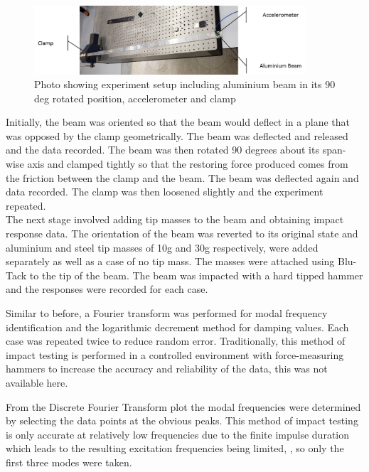 \documentclass[11pt]{article}
\begin{document}
\begin{figure}[H]
    \centering
    \includegraphics[width=0.9\textwidth]{photoedit.PNG}
    \caption{Photo showing experiment setup including aluminium beam in its 90 deg rotated position, accelerometer and clamp}
    \label{fig:photo}
\end{figure}{}

Initially, the beam was oriented so that the beam would deflect in a plane that was opposed by the clamp geometrically. The beam was deflected and released and the data recorded. The beam was then rotated 90 degrees about its span-wise axis and clamped tightly so that the restoring force produced comes from the friction between the clamp and the beam. The beam was deflected again and data recorded. The clamp was then loosened slightly and the experiment repeated. \\

The next stage involved adding tip masses to the beam and obtaining impact response data.
The orientation of the beam was reverted to its original state and aluminium and steel tip masses of 10g and 30g respectively, were added separately as well as a case of no tip mass. The masses were attached using Blu-Tack to the tip of the beam. The beam was impacted with a hard tipped hammer and the responses were recorded for each case.

Similar to before, a Fourier transform was performed for modal frequency identification and the logarithmic decrement method for damping values.
Each case was repeated twice to reduce random error. Traditionally, this method of impact testing is performed in a controlled environment with force-measuring hammers to increase the accuracy and reliability of the data, this was not available here.

From the Discrete Fourier Transform plot the modal frequencies were determined by selecting the data points at the obvious peaks. This method of impact testing is only accurate at relatively low frequencies due to the finite impulse duration which leads to the resulting excitation frequencies being limited, \cite{brano1}, so only the first three modes were taken.
\end{document}
